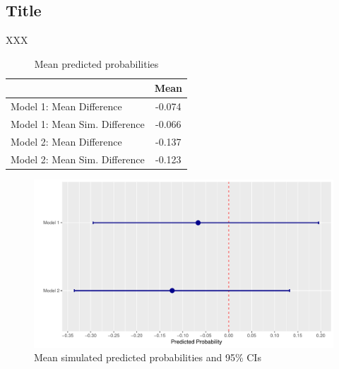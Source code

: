 \documentclass[12pt, letterpaper]{article}
\begin{document}
	
\setlength{\parindent}{1cm}
\parskip=0pt

\subsection*{\centering Title}

\noindent XXX

\pagebreak

\begin{table}
	\centering
	\caption{Mean predicted probabilities}\label{t2}
	\begin{tabular}[htpb!]{lc}
		\hline\hline
		& Mean \\ 
		\hline
		Model 1: Mean Difference & -0.074 \\ 
		Model 1: Mean Sim. Difference & -0.066 \\ 
		Model 2: Mean Difference & -0.137 \\ 
		Model 2: Mean Sim. Difference & -0.123 \\ 
		\hline
	\end{tabular}
\end{table}

\begin{figure}[t!]
	\includegraphics[scale=.7]{predplot.pdf}
	\caption{Mean simulated predicted probabilities and 95\% CIs}\label{f1}
\end{figure}


\end{document}

